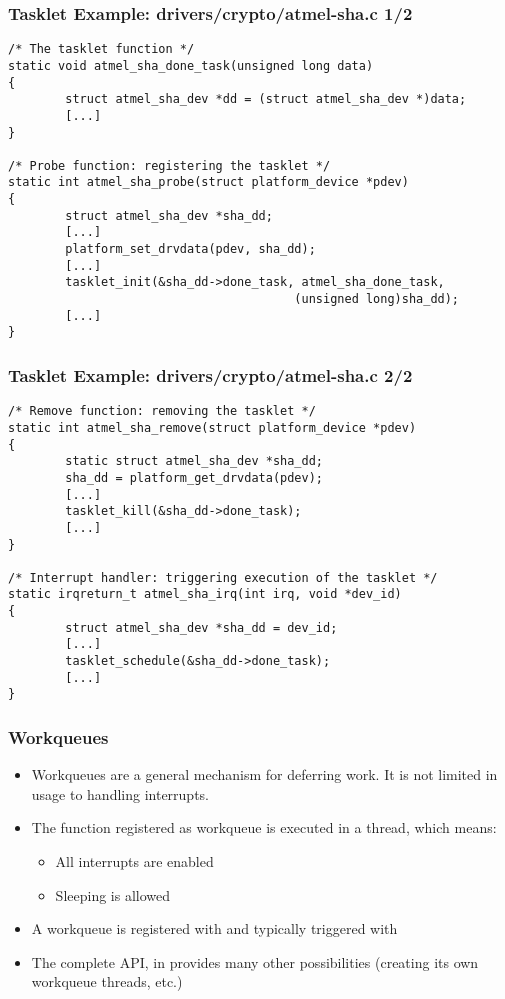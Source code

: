 \begin{frame}[fragile]
  \frametitle{Tasklet Example: drivers/crypto/atmel-sha.c 1/2}
\begin{verbatim}
/* The tasklet function */
static void atmel_sha_done_task(unsigned long data)
{
        struct atmel_sha_dev *dd = (struct atmel_sha_dev *)data;
        [...]
}

/* Probe function: registering the tasklet */
static int atmel_sha_probe(struct platform_device *pdev)
{
        struct atmel_sha_dev *sha_dd;
        [...]
        platform_set_drvdata(pdev, sha_dd);
        [...]
        tasklet_init(&sha_dd->done_task, atmel_sha_done_task,
                                        (unsigned long)sha_dd);
        [...]
}
\end{verbatim}
\end{frame}

\begin{frame}[fragile]
  \frametitle{Tasklet Example: drivers/crypto/atmel-sha.c 2/2}
\begin{verbatim}
/* Remove function: removing the tasklet */
static int atmel_sha_remove(struct platform_device *pdev)
{
        static struct atmel_sha_dev *sha_dd;
        sha_dd = platform_get_drvdata(pdev);
        [...]
        tasklet_kill(&sha_dd->done_task);
        [...]
}

/* Interrupt handler: triggering execution of the tasklet */
static irqreturn_t atmel_sha_irq(int irq, void *dev_id)
{
        struct atmel_sha_dev *sha_dd = dev_id;
        [...]
        tasklet_schedule(&sha_dd->done_task);
        [...]
}
\end{verbatim}
\end{frame}

\begin{frame}
  \frametitle{Workqueues}
  \begin{itemize}
  \item Workqueues are a general mechanism for deferring work. It is
    not limited in usage to handling interrupts.
  \item The function registered as workqueue is executed in a thread,
    which means:
    \begin{itemize}
    \item All interrupts are enabled
    \item Sleeping is allowed
    \end{itemize}
  \item A workqueue is registered with  and typically
    triggered with 
  \item The complete API, in  provides
    many other possibilities (creating its own workqueue threads,
    etc.)
  \end{itemize}
\end{frame}

